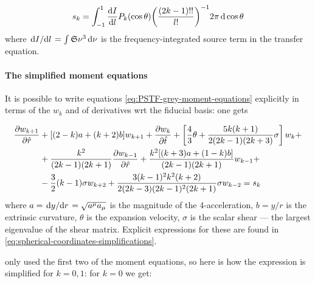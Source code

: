 \documentclass[main.tex]{subfiles}
\begin{document}
\begin{equation}
    s_k = \int_{-1}^1 \dv{I}{l} (\cos \theta) P_k(\cos \theta) \qty(\frac{(2k-1)!!}{l!})^{-1} 2 \pi\dd{\cos \theta}
\end{equation}
where \(\dv*{I}{l} = \int \mathfrak S \nu^3 \dd{\nu}\) is the frequency-integrated  source term in the transfer equation.

%

\paragraph{The simplified moment equations}

It is possible to write equations \eqref{eq:PSTF-grey-moment-equations} explicitly in terms of the \(w_k\) and of derivatives wrt the fiducial basis: one gets \cite[eq. 5.10c]{Thorne:1981feb}

\begin{equation} \label{eq:scalar-PSTF-moment-equations}
  \begin{split}
    \pdv{w_{k+1}}{\hat{r}} &+[(2-k) a+(k+2) b] w_{k+1}+\pdv{w_k}{\hat{t}}+\left[\frac{4}{3} \theta+\frac{5 k(k+1)}{2(2 k-1)(2 k+3)} \sigma\right] w_{k} + \\
    &+\frac{k^{2}}{(2 k-1)(2 k+1)} \pdv{w_{k-1}}{\hat{r}}+\frac{k^{2}[(k+3) a+(1-k) b]}{(2 k-1)(2 k+1)} w_{k-1} +  \\
    &-\frac{3}{2}(k-1) \sigma w_{k+2}+\frac{3(k-1)^{2} k^{2}(k+2)}{2(2 k-3)(2 k-1)^{2}(2 k+1)} \sigma w_{k-2} = s_k
    \end{split}
\end{equation}
where \(a = \dv*{y}{r} = \sqrt{a^\mu a_\mu}\) is the magnitude of the 4-acceleration, \(b = y/r\) is the extrinsic curvature, \(\theta\) is the expansion velocity, \(\sigma\) is the scalar shear --- the largest eigenvalue of the shear matrix. Explicit expressions for these are found in  \eqref{eq:spherical-coordinates-simplifications}.

\textcite[]{NobiliTurollaZampieri:1991dec} only used the first two of the moment equations, so here is how the expression is simplified for \(k=0,1\):
for \(k=0\) we get:
\end{document}
